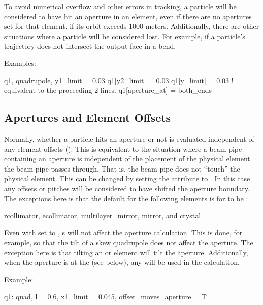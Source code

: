 To avoid numerical overflow and other errors in tracking, a particle
will be considered to have hit an aperture in an element, even if
there are no apertures set for that element, if its orbit exceeds 1000
meters. Additionally, there are other situations where a particle will
be considered lost. For example, if a particle's trajectory does
not intersect the output face in a bend.

Examples:
\begin{example}
  q1, quadrupole, y1_limit = 0.03
  q1[y2_limit] = 0.03
  q1[y_limit] = 0.03  ! equivalent to the proceeding 2 lines.  
  q1[aperture_at] = both_ends
\end{example}

\subsection{Apertures and Element Offsets}
\label{s:offset.ap}

Normally, whether a particle hits an aperture or not is evaluated
independent of any element offsets (). This is
equivalent to the situation where a beam pipe containing an aperture
is independent of the placement of the physical element the beam pipe
passes through. That is, the beam pipe does not ``touch'' the physical
element. This can be changed by setting the 
attribute to . In this case any offsets or pitches will be
considered to have shifted the aperture boundary. The exceptions here
is that the default for the following elements is for
 to be :
\begin{example}
  rcollimator, 
  ecollimator,
  multilayer_mirror, 
  mirror, and 
  crystal 
\end{example}

Even with  set to , s will
not affect the aperture calculation. This is done, for example, so
that the tilt of a skew quadrupole does not affect the aperture. The
exception here is that tilting an  or 
element will tilt the aperture. Additionally, when the aperture is at
the  (see below), any  will be used in the
calculation.

Example:
\begin{example}
  q1: quad, l = 0.6, x1_limit = 0.045, offset_moves_aperture = T
\end{example}

